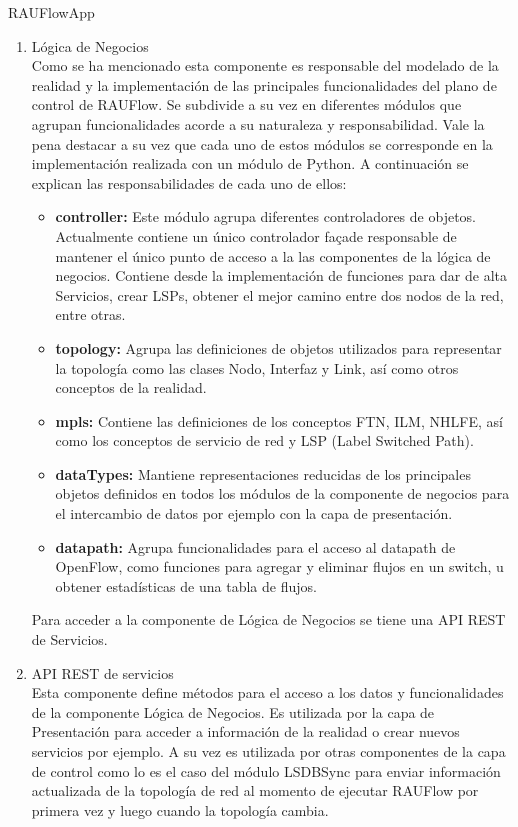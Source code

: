 \begin{subsubsection}{RAUFlowApp}
\begin{enumerate}
\item Lógica de Negocios\\
Como se ha mencionado esta componente es responsable del modelado de la realidad y la implementaci\'on de las principales funcionalidades del plano de control de RAUFlow. Se subdivide a su vez en diferentes m\'odulos que agrupan funcionalidades acorde a su naturaleza y responsabilidad. Vale la pena destacar a su vez que cada uno de estos m\'odulos se corresponde en la implementaci\'on realizada con un m\'odulo de Python. A continuaci\'on se explican las responsabilidades de cada uno de ellos:

\begin{itemize}
\item \textbf{controller:} Este m\'odulo agrupa diferentes controladores de objetos. Actualmente contiene un \'unico controlador façade responsable de mantener el \'unico punto de acceso a la las componentes de la l\'ogica de negocios. Contiene desde la implementaci\'on de funciones para dar de alta Servicios, crear LSPs, obtener el mejor camino entre dos nodos de la red, entre otras.

\item \textbf{topology:} Agrupa las definiciones de objetos utilizados para representar la topolog\'ia como las clases Nodo, Interfaz y Link, así como otros conceptos de la realidad.
 
\item \textbf{mpls:} Contiene las definiciones de los conceptos FTN, ILM, NHLFE, as\'i como los conceptos de servicio de red y LSP (Label Switched Path).

\item \textbf{dataTypes:} Mantiene representaciones reducidas de los principales objetos definidos en todos los m\'odulos de la componente de negocios para el intercambio de datos por ejemplo con la capa de presentaci\'on. 

\item \textbf{datapath:} Agrupa funcionalidades para el acceso al datapath de OpenFlow, como funciones para agregar y eliminar flujos en un switch, u obtener estad\'isticas de una tabla de flujos.
\end{itemize} 

Para acceder a la componente de Lógica de Negocios se tiene una API REST de Servicios.

\item API REST de servicios\\
Esta componente define m\'etodos para el acceso a los datos y funcionalidades de la componente Lógica de Negocios. Es utilizada por la capa de Presentaci\'on para acceder a informaci\'on de la realidad o crear nuevos servicios por ejemplo. A su vez es utilizada por otras componentes de la capa de control como lo es el caso del m\'odulo LSDBSync para enviar informaci\'on actualizada de la topolog\'ia de red al momento de ejecutar RAUFlow por primera vez y luego cuando la topolog\'ia cambia. 


\end{enumerate}
\end{subsubsection}
